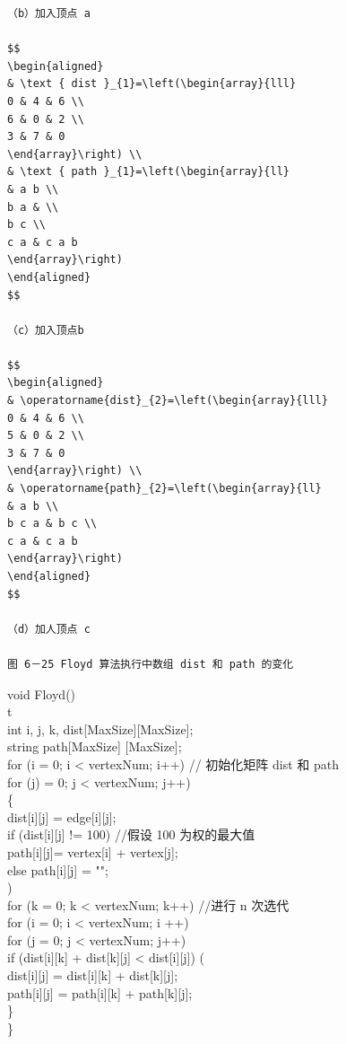 \documentclass[10pt]{article}
\begin{document}
\begin{verbatim}
（b）加入顶点 a

$$
\begin{aligned}
& \text { dist }_{1}=\left(\begin{array}{lll}
0 & 4 & 6 \\
6 & 0 & 2 \\
3 & 7 & 0
\end{array}\right) \\
& \text { path }_{1}=\left(\begin{array}{ll} 
& a b \\
b a & \\
b c \\
c a & c a b
\end{array}\right)
\end{aligned}
$$

（c）加入顶点b

$$
\begin{aligned}
& \operatorname{dist}_{2}=\left(\begin{array}{lll}
0 & 4 & 6 \\
5 & 0 & 2 \\
3 & 7 & 0
\end{array}\right) \\
& \operatorname{path}_{2}=\left(\begin{array}{ll} 
& a b \\
b c a & b c \\
c a & c a b
\end{array}\right)
\end{aligned}
$$

（d）加人顶点 c

图 6－25 Floyd 算法执行中数组 dist 和 path 的变化
\end{verbatim}

void Floyd()\\
t\\[0pt]
int i, j, k, dist[MaxSize][MaxSize];\\[0pt]
string path[MaxSize] [MaxSize];\\
for (i = 0; i < vertexNum; i++) // 初始化矩阵 dist 和 path\\
for (j) = 0; j < vertexNum; j++)\\
\{\\[0pt]
dist[i][j] = edge[i][j];\\[0pt]
if (dist[i][j] != 100) //假设 100 为权的最大值\\[0pt]
path[i][j]= vertex[i] + vertex[j];\\[0pt]
else path[i][j] = "";\\
)\\
for (k = 0; k < vertexNum; k++) //进行 n 次选代\\
for (i = 0; i < vertexNum; i ++)\\
for (j = 0; j < vertexNum; j++)\\[0pt]
if (dist[i][k] + dist[k][j] < dist[i][j]) (\\[0pt]
dist[i][j] = dist[i][k] + dist[k][j];\\[0pt]
path[i][j] = path[i][k] + path[k][j];\\
\}\\
\}
\end{document}
